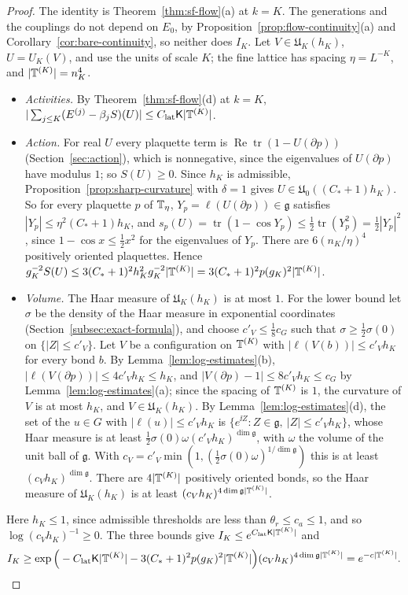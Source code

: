 \begin{proof}
The identity is Theorem~\ref{thm:sf-flow}(a) at $k=K$. The generations and the couplings do not depend on $E_0$, by Proposition~\ref{prop:flow-continuity}(a) and Corollary~\ref{cor:bare-continuity}, so neither does $I_K$. Let $V\in\mathfrak U_K(h_K)$, $U=U_K(V)$, and use the units of scale $K$; the fine lattice has spacing $\eta=L^{-K}$, and $|\mathbb T^{(K)}|=n_K^4$.
\begin{itemize}
\item \emph{Activities.} By Theorem~\ref{thm:sf-flow}(d) at $k=K$, $|\sum_{j\le K}(E^{(j)}-\beta_jS)(U)|\le C_{\rm lat}\mathsf K|\mathbb T^{(K)}|$.
\item \emph{Action.} For real $U$ every plaquette term is $\operatorname{Re}\operatorname{tr}(1-U(\partial p))$ (Section~\ref{sec:action}), which is nonnegative, since the eigenvalues of $U(\partial p)$ have modulus $1$; so $S(U)\ge0$. Since $h_K$ is admissible, Proposition~\ref{prop:sharp-curvature} with $\delta=1$ gives $U\in\mathfrak U_0((C_*+1)h_K)$. So for every plaquette $p$ of $\mathbb T_\eta$, $Y_p=\ell(U(\partial p))\in\mathfrak g$ satisfies $|Y_p|\le\eta^2(C_*+1)h_K$, and $s_p(U)=\operatorname{tr}(1-\cos Y_p)\le\frac12\operatorname{tr}(Y_p^2)=\frac12|Y_p|^2$, since $1-\cos x\le\frac12x^2$ for the eigenvalues of $Y_p$. There are $6(n_K/\eta)^4$ positively oriented plaquettes. Hence $g_K^{-2}S(U)\le3(C_*+1)^2h_K^2g_K^{-2}|\mathbb T^{(K)}|=3(C_*+1)^2p(g_K)^2|\mathbb T^{(K)}|$.
\item \emph{Volume.} The Haar measure of $\mathfrak U_K(h_K)$ is at most $1$. For the lower bound let $\sigma$ be the density of the Haar measure in exponential coordinates (Section~\ref{subsec:exact-formula}), and choose $c'_V\le\frac18c_G$ such that $\sigma\ge\frac12\sigma(0)$ on $\{|Z|\le c'_V\}$. Let $V$ be a configuration on $\mathbb T^{(K)}$ with $|\ell(V(b))|\le c'_Vh_K$ for every bond $b$. By Lemma~\ref{lem:log-estimates}(b), $|\ell(V(\partial p))|\le4c'_Vh_K\le h_K$, and $|V(\partial p)-1|\le8c'_Vh_K\le c_G$ by Lemma~\ref{lem:log-estimates}(a); since the spacing of $\mathbb T^{(K)}$ is $1$, the curvature of $V$ is at most $h_K$, and $V\in\mathfrak U_K(h_K)$. By Lemma~\ref{lem:log-estimates}(d), the set of the $u\in G$ with $|\ell(u)|\le c'_Vh_K$ is $\{e^{\ii Z}:Z\in\mathfrak g,\ |Z|\le c'_Vh_K\}$, whose Haar measure is at least $\frac12\sigma(0)\omega(c'_Vh_K)^{\dim\mathfrak g}$, with $\omega$ the volume of the unit ball of $\mathfrak g$. With $c_V=c'_V\min(1,(\frac12\sigma(0)\omega)^{1/\dim\mathfrak g})$ this is at least $(c_Vh_K)^{\dim\mathfrak g}$. There are $4|\mathbb T^{(K)}|$ positively oriented bonds, so the Haar measure of $\mathfrak U_K(h_K)$ is at least $(c_Vh_K)^{4\dim\mathfrak g|\mathbb T^{(K)}|}$.
\end{itemize}
Here $h_K\le1$, since admissible thresholds are less than $\theta_r\le c_a\le1$, and so $\log(c_Vh_K)^{-1}\ge0$. The three bounds give $I_K\le e^{C_{\rm lat}\mathsf K|\mathbb T^{(K)}|}$ and
\[
I_K\ge\exp\Big(-C_{\rm lat}\mathsf K|\mathbb T^{(K)}|-3(C_*+1)^2p(g_K)^2|\mathbb T^{(K)}|\Big)(c_Vh_K)^{4\dim\mathfrak g|\mathbb T^{(K)}|}=e^{-c|\mathbb T^{(K)}|}.\qedhere
\]
\end{proof}

